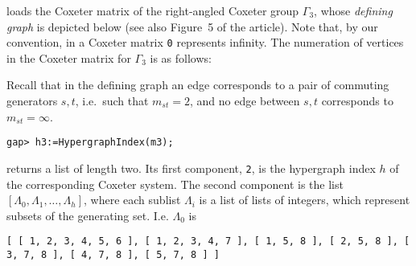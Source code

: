 \documentclass[10pt]{amsart}
\begin{document}
\noindent
loads the Coxeter matrix of the right-angled Coxeter group $\Gamma_3$, whose {\it defining graph\/} is depicted below (see also Figure~5 of the article). Note that, by our convention, in a Coxeter matrix {\tt0} represents infinity. The numeration of vertices in the Coxeter matrix for $\Gamma_3$ is as follows:

\begin{figure}[htb!] 
\end{figure}

\noindent
Recall that in the defining graph an edge corresponds to a pair of commuting generators $s,t$, i.e.\ such that $m_{st}=2$, and no edge between $s,t$ corresponds to $m_{st}=\infty$.

\medskip\noindent
{\footnotesize
\begin{verbatim}
gap> h3:=HypergraphIndex(m3);
\end{verbatim}}\noindent
returns a list of length two. Its first component, {\tt 2}, is the hypergraph index $h$ of the corresponding Coxeter system. The second component is the list $[\Lambda_0,\Lambda_1,\dots,\Lambda_h]$, where each sublist $\Lambda_i$ is a list of lists of integers, which represent subsets of the generating set. I.e. $\Lambda_0$ is
\medskip\noindent
{\footnotesize
\begin{verbatim}
[ [ 1, 2, 3, 4, 5, 6 ], [ 1, 2, 3, 4, 7 ], [ 1, 5, 8 ], [ 2, 5, 8 ], [ 3, 7, 8 ], [ 4, 7, 8 ], [ 5, 7, 8 ] ]
\end{verbatim}}
\end{document}
